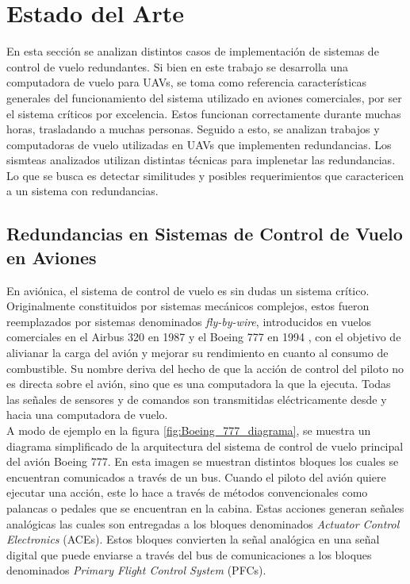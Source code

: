 
\section{Estado del Arte}\label{sec:estado_del_arte}

En esta sección se analizan distintos casos de implementación de sistemas de control de vuelo redundantes. Si bien en este trabajo se desarrolla una computadora de vuelo para UAVs, se toma como referencia características generales del funcionamiento del sistema utilizado en aviones comerciales, por ser el sistema críticos por excelencia. Estos funcionan correctamente durante muchas horas, trasladando a muchas personas. Seguido a esto, se analizan trabajos y computadoras de vuelo utilizadas en UAVs que implementen redundancias. Los sismteas analizados utilizan distintas técnicas para implenetar las redundancias. Lo que se busca es detectar similitudes y posibles requerimientos que caractericen a un sistema con redundancias. 

\subsection{Redundancias en Sistemas de Control de Vuelo en Aviones}

En aviónica, el sistema de control de vuelo es sin dudas un sistema crítico. Originalmente constituidos por sistemas mecánicos complejos, estos fueron reemplazados por sistemas denominados \textit{fly-by-wire}, introducidos en vuelos comerciales en el Airbus 320 en 1987 y el Boeing 777 en 1994 \cite{FBWNASA}, con el objetivo de alivianar la carga del avión y mejorar su rendimiento en cuanto al consumo de combustible. Su nombre deriva del hecho de que la acción de control del piloto no es directa sobre el avión, sino que es una computadora la que la ejecuta. Todas las señales de sensores y de comandos son transmitidas eléctricamente desde y hacia una computadora de vuelo.\\

A modo de ejemplo en la figura \ref{fig:Boeing_777_diagrama}, se muestra un diagrama simplificado de la arquitectura del sistema de control de vuelo principal del avión Boeing 777. En esta imagen se muestran distintos bloques los cuales se encuentran comunicados a través de un bus. Cuando el piloto del avión quiere ejecutar una acción, este lo hace a través de métodos convencionales como palancas o pedales que se encuentran en la cabina. Estas acciones generan señales analógicas las cuales son entregadas a los bloques denominados \textit{Actuator Control Electronics} (ACEs). Estos bloques convierten la señal analógica en una señal digital que puede enviarse a través del bus de comunicaciones a los bloques denominados \textit{Primary Flight Control System} (PFCs).

